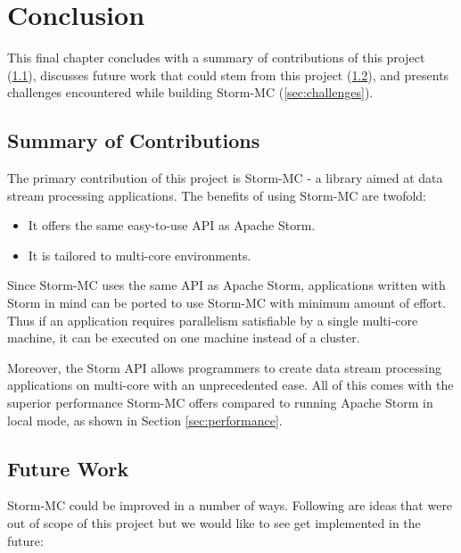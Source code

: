 \documentclass[bsc,twoside,singlespacing,normalheadings,parskip]{infthesis}\usepackage[]{graphicx}\usepackage[]{color}
\begin{document}
\clearpage{}

\clearpage{}\chapter{Conclusion}

This final chapter concludes with a summary of contributions of this project (\ref{sec:contribs}), discusses future work that could stem from this project (\ref{sec:future_work}), and presents challenges encountered while building Storm-MC (\ref{sec:challenges}).

\section{Summary of Contributions}
\label{sec:contribs}

The primary contribution of this project is Storm-MC - a library aimed at data stream processing applications. The benefits of using Storm-MC are twofold:

\begin{itemize}
	\item It offers the same easy-to-use API as Apache Storm.
	\item It is tailored to multi-core environments.
\end{itemize}

Since Storm-MC uses the same API as Apache Storm, applications written with Storm in mind can be ported to use Storm-MC with minimum amount of effort. Thus if an application requires parallelism satisfiable by a single multi-core machine, it can be executed on one machine instead of a cluster.

Moreover, the Storm API allows programmers to create data stream processing applications on multi-core with an unprecedented ease. All of this comes with the superior performance Storm-MC offers compared to running Apache Storm in local mode, as shown in Section \ref{sec:performance}.

\section{Future Work}
\label{sec:future_work}

Storm-MC could be improved in a number of ways. Following are ideas that were out of scope of this project but we would like to see get implemented in the future:
\end{document}
